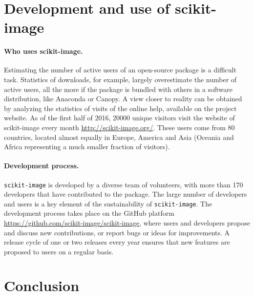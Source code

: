 \documentclass[twocolumn]{bmcart}%
\begin{document}
\section*{Development and use of scikit-image}

\paragraph{Who uses scikit-image.}

Estimating the number of active users of an open-source package is a
difficult task. Statistics of downloads, for example, largely
overestimate the number of active users, all the more if the package is
bundled with others in a software distribution, like Anaconda or
Canopy. A view closer to reality can be obtained by analyzing the
statistics of visits of the online help, available on the project
website.  As of the first half of 2016, 20000 unique visitors visit the
website of scikit-image every month \url{http://scikit-image.org/}. These
users come from 80 countries, located almost equally in Europe, America
and Asia (Oceania and Africa representing a much smaller fraction of
visitors).

\paragraph{Development process.}

\texttt{scikit-image} is developed by a diverse team of volunteers, with
more than 170 developers that have contributed to the package. The large
number of developers and users is a key element of the sustainability of
\texttt{scikit-image}. The
development process takes place on the GitHub platform
\url{https://github.com/scikit-image/scikit-image}, where users and
developers propose and discuss new contributions, or report bugs or ideas
for improvements.
A release cycle of one or two releases every year
ensures that new features are proposed to users on a regular basis.

\section*{Conclusion}
\end{document}
